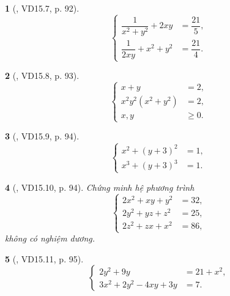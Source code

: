 \documentclass{article}
\newtheorem{baitoan}{}
\begin{document}
\begin{baitoan}[\cite{TLCT_THCS_Toan_9_dai_so}, VD15.7, p. 92]
	\begin{equation*}
		\left\{\begin{split}
			\dfrac{1}{x^2 + y^2} + 2xy &= \dfrac{21}{5},\\
			\dfrac{1}{2xy} + x^2 + y^2 &= \dfrac{21}{4}.
		\end{split}\right.
	\end{equation*}
\end{baitoan}

\begin{baitoan}[\cite{TLCT_THCS_Toan_9_dai_so}, VD15.8, p. 93]
	\begin{equation*}
		\left\{\begin{split}
			x + y &= 2,\\
			x^2y^2(x^2 + y^2) &= 2,\\
			x,y&\ge0.
		\end{split}\right.
	\end{equation*}
\end{baitoan}

\begin{baitoan}[\cite{TLCT_THCS_Toan_9_dai_so}, VD15.9, p. 94]
	\begin{equation*}
		\left\{\begin{split}
			x^2 + (y + 3)^2 &= 1,\\
			x^3 + (y + 3)^3 &= 1.
		\end{split}\right.
	\end{equation*}
\end{baitoan}

\begin{baitoan}[\cite{TLCT_THCS_Toan_9_dai_so}, VD15.10, p. 94]
	Chứng minh hệ phương trình
	\begin{equation*}
		\left\{\begin{split}
			2x^2 + xy + y^2 &= 32,\\
			2y^2 + yz + z^2 &= 25,\\
			2z^2 + zx + x^2 &= 86,
		\end{split}\right.
	\end{equation*}
	không có nghiệm dương.
\end{baitoan}

\begin{baitoan}[\cite{TLCT_THCS_Toan_9_dai_so}, VD15.11, p. 95]
	\begin{equation*}
		\left\{\begin{split}
			2y^2 + 9y &= 21 + x^2,\\
			3x^2 + 2y^2 - 4xy + 3y &= 7.
		\end{split}\right.
	\end{equation*}
\end{baitoan}
\end{document}
